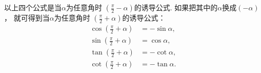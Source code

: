 以上四个公式是当\(\alpha\)为任意角时
\(\left(\frac{\pi}{2}-\alpha\right)\)的诱导公式.
如果把其中的\(\alpha\)换成\((-\alpha)\)，
就可得到当\(\alpha\)为任意角时
\(\left(\frac{\pi}{2}+\alpha\right)\)的诱导公式：
\begin{align}
	\cos\left(\frac{\pi}{2}+\alpha\right)
	&= -\sin\alpha,
		\label{equation:函数.三角函数.诱导公式13} \\
	\sin\left(\frac{\pi}{2}+\alpha\right)
	&= \cos\alpha,
		\label{equation:函数.三角函数.诱导公式14} \\
	\tan\left(\frac{\pi}{2}+\alpha\right)
	&= -\cot\alpha,
		\label{equation:函数.三角函数.诱导公式15} \\
	\cot\left(\frac{\pi}{2}+\alpha\right)
	&= -\tan\alpha.
		\label{equation:函数.三角函数.诱导公式16}
\end{align}


